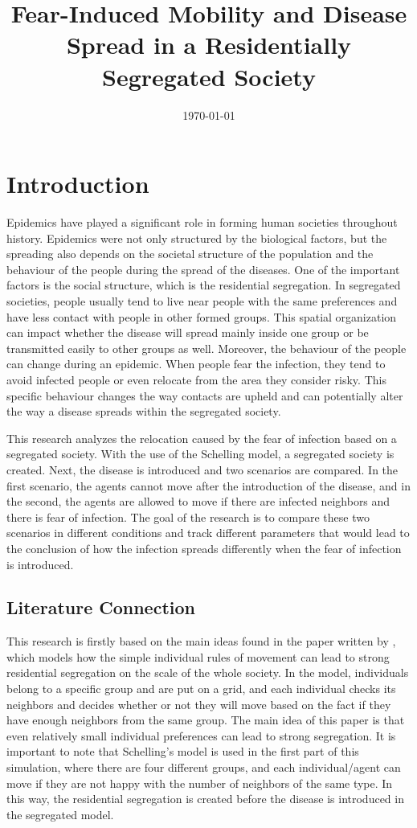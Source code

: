 \documentclass[11pt,a4paper]{article}
\title{Fear-Induced Mobility and Disease Spread in a Residentially Segregated Society}
\date{\today}
\begin{document}
\maketitle


\newpage
\section{Introduction}

Epidemics have played a significant role in forming human societies throughout history. Epidemics were not only structured by the biological factors, but the spreading also depends on the societal structure of the population and the behaviour of the people during the spread of the diseases. One of the important factors is the social structure, which is the residential segregation. In segregated societies, people usually tend to live near people with the same preferences and have less contact with people in other formed groups. This spatial organization can impact whether the disease will spread mainly inside one group or be transmitted easily to other groups as well. Moreover, the behaviour of the people can change during an epidemic. When people fear the infection, they tend to avoid infected people or even relocate from the area they consider risky. This specific behaviour changes the way contacts are upheld and can potentially alter the way a disease spreads within the segregated society. 


This research analyzes the relocation caused by the fear of infection based on a segregated society. With the use of the Schelling model, a segregated society is created. Next, the disease is introduced and two scenarios are compared. In the first scenario, the agents cannot move after the introduction of the disease, and in the second, the agents are allowed to move if there are infected neighbors and there is fear of infection. The goal of the research is to compare these two scenarios in different conditions and track different parameters that would lead to the conclusion of how the infection spreads differently when the fear of infection is introduced.

\subsection{Literature Connection}
This research is firstly based on the main ideas found in the paper written by \citet{schelling1971dynamic}, which models how the simple individual rules of movement can lead to strong residential segregation on the scale of the whole society. In the model, individuals belong to a specific group and are put on a grid, and each individual checks its neighbors and decides whether or not they will move based on the fact if they have enough neighbors from the same group. The main idea of this paper is that even relatively small individual preferences can lead to strong segregation. It is important to note that Schelling’s model is used in the first part of this simulation, where there are four different groups, and each individual/agent can move if they are not happy with the number of neighbors of the same type. In this way, the residential segregation is created before the disease is introduced in the segregated model. 
\end{document}
